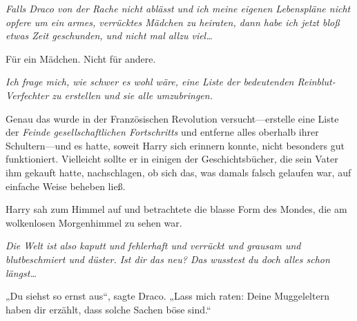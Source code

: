 \emph{Falls Draco von der Rache nicht ablässt und ich meine eigenen Lebenspläne nicht opfere um ein armes, verrücktes Mädchen zu heiraten, dann habe ich jetzt bloß etwas Zeit geschunden, und nicht mal allzu viel…}

Für ein Mädchen. Nicht für andere.

\emph{Ich frage mich, wie schwer es wohl wäre, eine Liste der bedeutenden Reinblut-Verfechter zu erstellen und sie alle umzubringen.}

Genau das wurde in der Französischen Revolution versucht—erstelle eine Liste der \emph{Feinde gesellschaftlichen Fortschritts} und entferne alles oberhalb ihrer Schultern—und es hatte, soweit Harry sich erinnern konnte, nicht besonders gut funktioniert. Vielleicht sollte er in einigen der Geschichtsbücher, die sein Vater ihm gekauft hatte, nachschlagen, ob sich das, was damals falsch gelaufen war, auf einfache Weise beheben ließ.

Harry sah zum Himmel auf und betrachtete die blasse Form des Mondes, die am wolkenlosen Morgenhimmel zu sehen war.

\emph{Die Welt ist also kaputt und fehlerhaft und verrückt und grausam und blutbeschmiert und düster. Ist dir das neu? Das wusstest du doch alles schon längst…}

„Du siehst so ernst aus“, sagte Draco. „Lass mich raten: Deine Muggeleltern haben dir erzählt, dass solche Sachen böse sind.“

